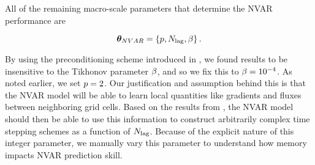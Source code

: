 All of the remaining macro-scale parameters that determine the NVAR performance are
\begin{linenomath*}\begin{equation*}
    \bm{\theta}_{NVAR} =
    \{ p, N_\text{lag}, \beta \} \, .
\end{equation*}\end{linenomath*}
By using the preconditioning scheme introduced in \citet{chen_next_2022},
we found results to be insensitive to the Tikhonov parameter $\beta$, and so
we fix this to $\beta = 10^{-4}$.
As noted earlier, we set $p = 2$.
Our justification and assumption behind this is that the NVAR model will be able to learn local
quantities like gradients and fluxes between neighboring grid cells.
Based on the results from \citet{chen_next_2022},
the NVAR model should then be able to use this information to construct
arbitrarily complex time stepping schemes as a function of $N_\text{lag}$.
Because of the explicit nature of this integer parameter, we manually vary this
parameter to understand how memory impacts NVAR prediction skill.
